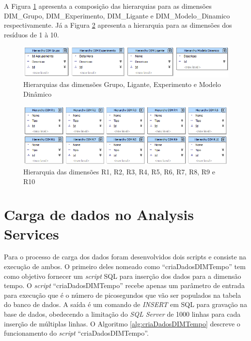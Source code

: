 \newpage

A Figura \ref{fig:hierarGrupoLiganteExperimentoModelo} apresenta a composição das hierarquias para as dimensões DIM\_Grupo, DIM\_Experimento, DIM\_Ligante e DIM\_Modelo\_Dinamico respectivamente. Já a Figura \ref{fig:HierarR1ateR10} apresenta a hierarquia para as dimensões dos resíduos de 1 à 10.

\begin{figure}[h]
        \center
        \includegraphics[scale=0.6]{images/Hierar_Grupo_Ligante_Experimento_Modelo.png}
        \caption{Hierarquias das dimensões Grupo, Ligante, Experimento e Modelo Dinâmico}
        \label{fig:hierarGrupoLiganteExperimentoModelo}
\end{figure}

\begin{figure}[h]
        \center
        \includegraphics[scale=0.6]{images/Hierar_DIMR1_ate_10.png}
        \caption{Hierarquia das dimensões R1, R2, R3, R4, R5, R6, R7, R8, R9 e R10}
        \label{fig:HierarR1ateR10}
\end{figure}	

\section{Carga de dados no Analysis Services}
\label{sec:CargaDeDadosNoAnalysisServices}

Para o processo de carga dos dados foram desenvolvidos dois scripts e consiste na execução de ambos. O primeiro deles nomeado como ``criaDadosDIMTempo'' tem como objetivo fornecer um \emph{script} SQL para inserção dos dados para a dimensão tempo. O \emph{script} ``criaDadosDIMTempo'' recebe apenas um parâmetro de entrada para execução que é o número de picosegundos que vão ser populados na tabela do banco de dados. A saída é um comando de \emph{INSERT} em SQL para gravação na base de dados, obedecendo a limitação do \emph{SQL Server} de 1000 linhas para cada inserção de múltiplas linhas. O Algoritmo \ref{alg:criaDadosDIMTempo} descreve o funcionamento do \emph{script} ``criaDadosDIMTempo''. 

